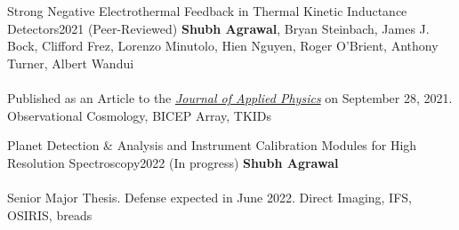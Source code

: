 
\begin{projects}
\project
{Strong Negative Electrothermal Feedback in Thermal Kinetic Inductance Detectors}{2021}
{(Peer-Reviewed)   \smallskip}
{\textbf{Shubh Agrawal}, Bryan Steinbach, James J. Bock, Clifford Frez, Lorenzo Minutolo, Hien Nguyen, Roger O'Brient, Anthony Turner, Albert Wandui 
\\ \quad \\
Published as an Article to the \underline{\textit{Journal of Applied Physics}} on September 28, 2021.}
{Observational Cosmology, BICEP Array, TKIDs}

\project
{Planet Detection \& Analysis and Instrument Calibration Modules for High Resolution Spectroscopy}{2022}
{(In progress)}
{\textbf{Shubh Agrawal}
\\ \quad \\
Senior Major Thesis. Defense expected in June 2022.}
{Direct Imaging, IFS, OSIRIS, breads}

\end{projects}